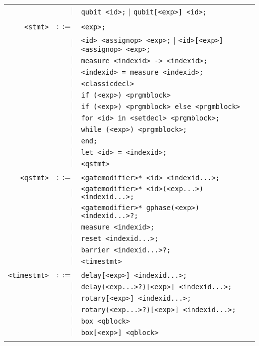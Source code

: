 \documentclass[notitlepage]{article}
\begin{document}
\begin{longtable}{rrl}
	    & $\mid$ & \texttt{qubit <id>;} $\mid$ \texttt{qubit[<exp>] <id>;} \\ \\
	\texttt{<stmt>} & $::=$ & \texttt{<exp>;} \\
	    & $\mid$ & \texttt{<id> <assignop> <exp>;} $\mid$ \texttt{<id>[<exp>] <assignop> <exp>;} \\
	    & $\mid$ & \texttt{measure <indexid> -> <indexid>;} \\
	    & $\mid$ & \texttt{<indexid> = measure <indexid>;} \\
	    & $\mid$ & \texttt{<classicdecl>} \\
	    & $\mid$ & \texttt{if (<exp>) <prgmblock>} \\
	    & $\mid$ & \texttt{if (<exp>) <prgmblock> else <prgmblock>} \\
	    & $\mid$ & \texttt{for <id> in <setdecl> <prgmblock>;} \\
	    & $\mid$ & \texttt{while (<exp>) <prgmblock>;} \\
	    & $\mid$ & \texttt{end;} \\
	    & $\mid$ & \texttt{let <id> = <indexid>;} \\
	    & $\mid$ & \texttt{<qstmt>} \\ \\
	\texttt{<qstmt>} & $::=$ & \texttt{<gatemodifier>* <id> <indexid...>;} \\
	    & $\mid$ & \texttt{<gatemodifier>* <id>(<exp...>) <indexid...>;} \\
	    & $\mid$ & \texttt{<gatemodifier>* gphase(<exp>) <indexid...>?;} \\
	    & $\mid$ & \texttt{measure <indexid>;} \\
	    & $\mid$ & \texttt{reset <indexid...>;} \\
	    & $\mid$ & \texttt{barrier <indexid...>?;} \\
	    & $\mid$ & \texttt{<timestmt>} \\ \\
	\texttt{<timestmt>} & $::=$ & \texttt{delay[<exp>] <indexid...>;} \\
	    & $\mid$ & \texttt{delay(<exp...>?)[<exp>] <indexid...>;} \\
	    & $\mid$ & \texttt{rotary[<exp>] <indexid...>;} \\
	    & $\mid$ & \texttt{rotary(<exp...>?)[<exp>] <indexid...>;} \\
	    & $\mid$ & \texttt{box <qblock>} \\
	    & $\mid$ & \texttt{box[<exp>] <qblock>} \\ \\

\end{longtable}
\end{document}
